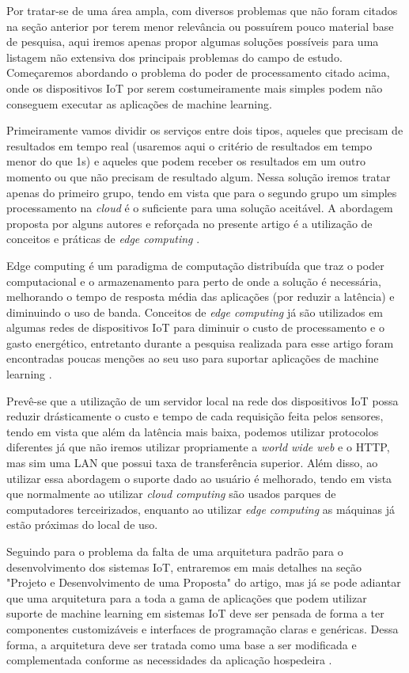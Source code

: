\documentclass[12pt]{article}
\begin{document}
Por tratar-se de uma área ampla, com diversos problemas que não foram citados na seção anterior por terem menor relevância ou possuírem pouco material base de pesquisa, aqui iremos apenas propor algumas soluções possíveis para uma listagem não extensiva dos principais problemas do campo de estudo. Começaremos abordando o problema do poder de processamento citado acima, onde os dispositivos IoT por serem costumeiramente mais simples podem não conseguem executar as aplicações de machine learning.

Primeiramente vamos dividir os serviços entre dois tipos, aqueles que precisam de resultados em tempo real (usaremos aqui o critério de resultados em tempo menor do que 1s) e aqueles que podem receber os resultados em um outro momento ou que não precisam de resultado algum. Nessa solução iremos tratar apenas do primeiro grupo, tendo em vista que para o segundo grupo um simples processamento na \emph{cloud} é o suficiente para uma solução aceitável. A abordagem proposta por alguns autores e reforçada no presente artigo é a utilização de conceitos e práticas de \emph{edge computing} \cite{vitali}.

Edge computing é um paradigma de computação distribuída que traz o poder computacional e o armazenamento para perto de onde a solução é necessária, melhorando o tempo de resposta média das aplicações (por reduzir a latência) e diminuindo o uso de banda. Conceitos de \emph{edge computing} já são utilizados em algumas redes de dispositivos IoT para diminuir o custo de processamento e o gasto energético, entretanto durante a pesquisa realizada para esse artigo foram encontradas poucas menções ao seu uso para suportar aplicações de machine learning \cite{vitali}.

Prevê-se que a utilização de um servidor local na rede dos dispositivos IoT possa reduzir drásticamente o custo e tempo de cada requisição feita pelos sensores, tendo em vista que além da latência mais baixa, podemos utilizar protocolos diferentes já que não iremos utilizar propriamente a \emph{world wide web} e o HTTP, mas sim uma LAN que possui taxa de transferência superior. Além disso, ao utilizar essa abordagem o suporte dado ao usuário é melhorado, tendo em vista que normalmente ao utilizar \emph{cloud computing} são usados parques de computadores terceirizados, enquanto ao utilizar \emph{edge computing} as máquinas já estão próximas do local de uso.

Seguindo para o problema da falta de uma arquitetura padrão para o desenvolvimento dos sistemas IoT, entraremos em mais detalhes na seção "Projeto e Desenvolvimento de uma Proposta" do artigo, mas já se pode adiantar que uma arquitetura para a toda a gama de aplicações que podem utilizar suporte de machine learning em sistemas IoT deve ser pensada de forma a ter componentes customizáveis e interfaces de programação claras e genéricas. Dessa forma, a arquitetura deve ser tratada como uma base a ser modificada e complementada conforme as necessidades da aplicação hospedeira \cite{sacco}.
\end{document}
